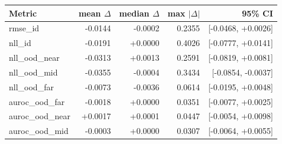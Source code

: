 \begin{tabular}{lrrrr}
\toprule
Metric & mean $\Delta$ & median $\Delta$ & max $|\Delta|$ & 95\% CI \\
\midrule
rmse\_id & -0.0144 & -0.0002 & 0.2355 & [-0.0468, +0.0026] \\
nll\_id & -0.0191 & +0.0000 & 0.4026 & [-0.0777, +0.0141] \\
nll\_ood\_near & -0.0313 & +0.0013 & 0.2591 & [-0.0819, +0.0081] \\
nll\_ood\_mid & -0.0355 & -0.0004 & 0.3434 & [-0.0854, -0.0037] \\
nll\_ood\_far & -0.0073 & -0.0036 & 0.0614 & [-0.0195, +0.0048] \\
auroc\_ood\_far & -0.0018 & +0.0000 & 0.0351 & [-0.0077, +0.0025] \\
auroc\_ood\_near & +0.0017 & +0.0001 & 0.0447 & [-0.0054, +0.0098] \\
auroc\_ood\_mid & -0.0003 & +0.0000 & 0.0307 & [-0.0064, +0.0055] \\
\bottomrule
\end{tabular}
